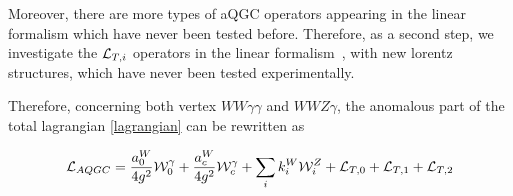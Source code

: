 Moreover, there are more types of aQGC operators appearing in the linear
formalism which have never been tested before. Therefore, as a second
step, we investigate the ${\cal L}_{T,i}$ operators in the linear
formalism~\cite{Eboli:2006wa}, with new lorentz structures, which have
never been tested experimentally.

Therefore, concerning both vertex $WW\gamma \gamma$ and $WWZ\gamma$, the anomalous part of the total lagrangian \eqref{lagrangian} can be rewritten as

\begin{equation}\label{lagrangian}
{\cal L}_{AQGC} = \dfrac{a_0^W}{4 g^2} {\cal W}_{0}^{\gamma} + \dfrac{a_c^W}{4 g^2} {\cal W}_{c}^{\gamma} + \sum_i k_i^{W} {\cal W}_{i}^{Z} + {\cal L}_{T,0} + {\cal L}_{T,1} + {\cal L}_{T,2}
\end{equation}

